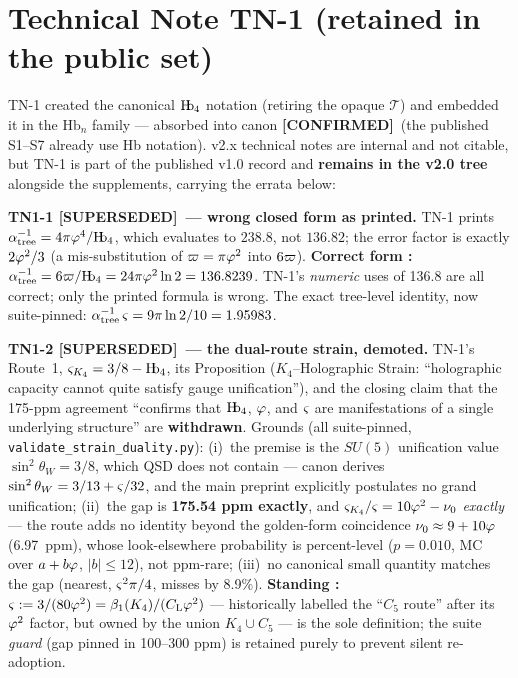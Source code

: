 \documentclass[11pt,a4paper]{article}
\newcommand{\SUP}{\textcolor{Ecolor}{\textbf{[SUPERSEDED]}}}     %
\newcommand{\OK}{\textcolor{Rcolor}{\textbf{[CONFIRMED]}}}       %
\begin{document}
\section{Technical Note TN-1 (retained in the public set)}
\label{sec:tn1}

TN-1 created the canonical $\textnormal{H\kern-0.3em b}_4$ notation (retiring the opaque
$\mathcal{T}$) and embedded it in the $\mathrm{Hb}_n$ family --- absorbed
into canon \OK\ (the published S1--S7 already use Hb notation). v2.x
technical notes are internal and not citable, but TN-1 is part of the
published v1.0 record and \textbf{remains in the v2.0 tree} alongside the
supplements, carrying the errata below:

\begin{mdframed}[backgroundcolor=Ebg,linecolor=Ecolor,linewidth=1.2pt]
\textbf{TN1-1 \SUP\ --- wrong closed form as printed.} TN-1
prints $\alpha^{-1}_{\mathrm{tree}} = 4\pi\varphi^4/\textnormal{H\kern-0.3em b}_4$, which evaluates
to $238.8$, not $136.82$; the error factor is exactly $2\varphi^2/3$ (a
mis-substitution of $\varpi = \pi\varphi^2$ into $6\varpi$).
\textbf{Correct form \Rmark:} $\alpha^{-1}_{\mathrm{tree}} =
6\varpi/\textnormal{H\kern-0.3em b}_4 = 24\pi\varphi^2\ln 2 = 136.8239$. TN-1's \emph{numeric}
uses of 136.8 are all correct; only the printed formula is wrong. The
exact tree-level identity, now suite-pinned:
$\alpha^{-1}_{\mathrm{tree}}\,\varsigma = 9\pi\ln2/10 = 1.95983$.
\end{mdframed}

\begin{mdframed}[backgroundcolor=Ebg,linecolor=Ecolor,linewidth=1.2pt]
\textbf{TN1-2 \SUP\ --- the dual-route strain, demoted.} TN-1's
Route~1, $\varsigma_{K_4} = 3/8 - \textnormal{H\kern-0.3em b}_4$, its Proposition ($K_4$--Holographic
Strain: ``holographic capacity cannot quite satisfy gauge unification''),
and the closing claim that the 175-ppm agreement ``confirms that
$\textnormal{H\kern-0.3em b}_4$, $\varphi$, and $\varsigma$ are manifestations of a single underlying
structure'' are \textbf{withdrawn}. Grounds (all suite-pinned,
\texttt{validate\_strain\_duality.py}):
(i)~the premise is the $SU(5)$ unification value $\sin^2\theta_W = 3/8$,
which QSD does not contain --- canon derives $\sin^2\theta_W = 3/13 +
\varsigma/32$, and the main preprint explicitly postulates no grand unification;
(ii)~the gap is \textbf{175.54 ppm exactly}, and
$\varsigma_{K_4}/\varsigma = 10\varphi^2 - \nu_0$ \emph{exactly} --- the route adds no
identity beyond the golden-form coincidence $\nu_0 \approx 9 + 10\varphi$
(6.97~ppm), whose look-elsewhere probability is percent-level
($p = 0.010$, MC over $a+b\varphi$, $|b| \le 12$), not ppm-rare;
(iii)~no canonical small quantity matches the gap (nearest,
$\varsigma^2\pi/4$, misses by 8.9\%).
\textbf{Standing \Rmark:} $\varsigma := 3/(80\varphi^2) =
\beta_1(K_4)/(C_{\mathrm{L}}\varphi^2)$ --- historically labelled the
``$C_5$ route'' after its $\varphi^2$ factor, but owned by the union
$K_4 \cup C_5$ --- is the sole definition; the suite
\emph{guard} (gap pinned in 100--300 ppm) is retained
purely to prevent silent re-adoption.
\end{mdframed}
\end{document}
